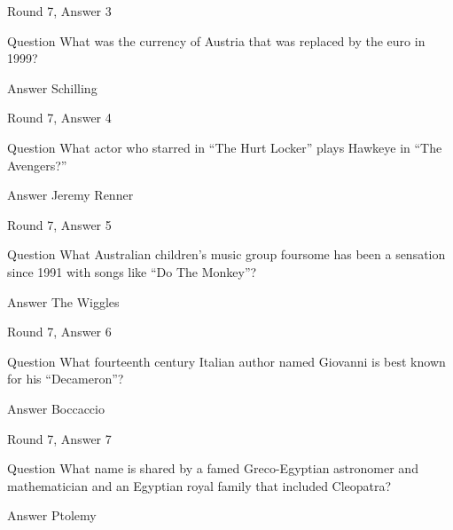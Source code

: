 \documentclass[11pt]{beamer}
\begin{document}
\begin{frame}[t]{Round 7, Answer 3}
\vspace{2em}
\begin{block}{Question}
What was the currency of Austria that was replaced by the euro in 1999\@?
\end{block}
\pause{}
\begin{block}{Answer}
Schilling
\end{block}
\end{frame}
    

\begin{frame}[t]{Round 7, Answer 4}
\vspace{2em}
\begin{block}{Question}
What actor who starred in ``The Hurt Locker'' plays Hawkeye in ``The Avengers?''
\end{block}
\pause{}
\begin{block}{Answer}
Jeremy Renner
\end{block}
\end{frame}
    

\begin{frame}[t]{Round 7, Answer 5}
\vspace{2em}
\begin{block}{Question}
What Australian children's music group foursome has been a sensation since 1991 with songs like ``Do The Monkey''\@?
\end{block}
\pause{}
\begin{block}{Answer}
The Wiggles
\end{block}
\end{frame}
    

\begin{frame}[t]{Round 7, Answer 6}
\vspace{2em}
\begin{block}{Question}
What fourteenth century Italian author named Giovanni is best known for his ``Decameron''\@?
\end{block}
\pause{}
\begin{block}{Answer}
Boccaccio
\end{block}
\end{frame}
    

\begin{frame}[t]{Round 7, Answer 7}
\vspace{2em}
\begin{block}{Question}
What name is shared by a famed Greco-Egyptian astronomer and mathematician and an Egyptian royal family that included Cleopatra\@?
\end{block}
\pause{}
\begin{block}{Answer}
Ptolemy
\end{block}
\end{frame}
    
\end{document}
